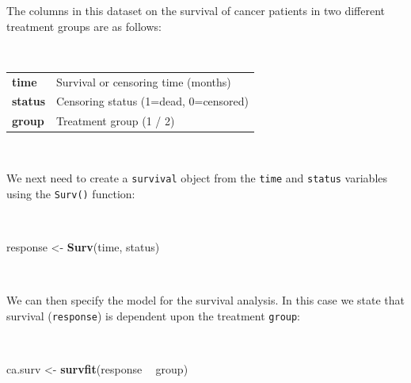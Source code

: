 \documentclass[12pt,a4paper]{book}
\newenvironment{Shaded}{\begin{snugshade}}{\end{snugshade}}
\newcommand{\KeywordTok}[1]{\textcolor[rgb]{0.13,0.29,0.53}{\textbf{#1}}}
\newcommand{\NormalTok}[1]{#1}
\newcommand{\OperatorTok}[1]{\textcolor[rgb]{0.81,0.36,0.00}{\textbf{#1}}}
\newcommand{\StringTok}[1]{\textcolor[rgb]{0.31,0.60,0.02}{#1}}
\theoremstyle{definition}
\theoremstyle{definition}
\theoremstyle{definition}
\theoremstyle{remark}
\begin{document}
The columns in this dataset on the survival of cancer patients in two
different treatment groups are as follows:

~

\begin{longtable}[]{@{}ll@{}}
\toprule
\endhead
\begin{minipage}[t]{0.21\columnwidth}\raggedright
\textbf{time}\strut
\end{minipage} & \begin{minipage}[t]{0.54\columnwidth}\raggedright
Survival or censoring time (months)\strut
\end{minipage}\tabularnewline
\begin{minipage}[t]{0.21\columnwidth}\raggedright
\textbf{status}\strut
\end{minipage} & \begin{minipage}[t]{0.54\columnwidth}\raggedright
Censoring status (1=dead, 0=censored)\strut
\end{minipage}\tabularnewline
\begin{minipage}[t]{0.21\columnwidth}\raggedright
\textbf{group}\strut
\end{minipage} & \begin{minipage}[t]{0.54\columnwidth}\raggedright
Treatment group (1 / 2)\strut
\end{minipage}\tabularnewline
\bottomrule
\end{longtable}

~

We next need to create a \texttt{survival} object from the \texttt{time}
and \texttt{status} variables using the \texttt{Surv()} function:

~

\begin{Shaded}
\begin{Highlighting}[]
\NormalTok{response <-}\StringTok{ }\KeywordTok{Surv}\NormalTok{(time, status)}
\end{Highlighting}
\end{Shaded}

~

We can then specify the model for the survival analysis. In this case we
state that survival (\texttt{response}) is dependent upon the treatment
\texttt{group}:

~

\begin{Shaded}
\begin{Highlighting}[]
\NormalTok{ca.surv <-}\StringTok{ }\KeywordTok{survfit}\NormalTok{(response }\OperatorTok{~}\StringTok{ }\NormalTok{group)}
\end{Highlighting}
\end{Shaded}
\end{document}
